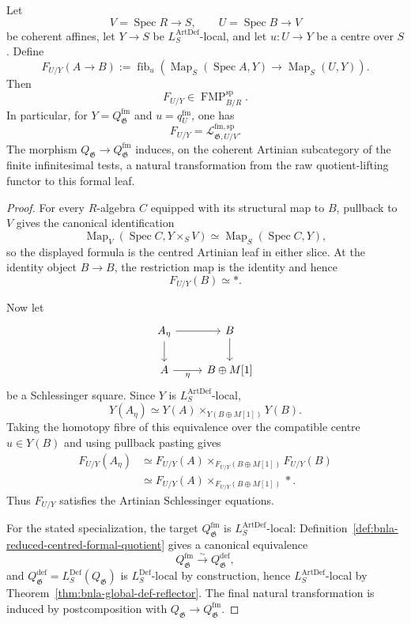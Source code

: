 \begin{proposition}
\label{prop:bnla-affine-leaf-is-fmp}
Let
\[
    V=\operatorname{Spec}R\longrightarrow S,
    \qquad
    U=\operatorname{Spec}B\longrightarrow V
\]
be coherent affines, let $Y\to S$ be $L^{\mathrm{ArtDef}}_S$-local, and let
$u:U\to Y$ be a centre over $S$.  Define
\[
\boxed{
    F_{U/Y}(A\to B)
    :=
    \operatorname{fib}_{u}
    \left(
        \operatorname{Map}_S(\operatorname{Spec}A,Y)
        \longrightarrow
        \operatorname{Map}_S(U,Y)
    \right).}
\]
Then
\[
\boxed{
    F_{U/Y}\in\operatorname{FMP}^{\mathrm{sp}}_{B/R}.}
\]
In particular, for
$Y=Q^{\mathrm{fm}}_{\mathfrak G}$ and $u=q^{\mathrm{fm}}_U$, one has
\[
    F_{U/Y}
    =
    \mathcal L^{\mathrm{fm,sp}}_{\mathfrak G,U/V}.
\]
The morphism
$Q_{\mathfrak G}\to Q^{\mathrm{fm}}_{\mathfrak G}$ induces, on the
coherent Artinian subcategory of the finite infinitesimal tests, a natural
transformation from the raw quotient-lifting functor to this formal leaf.
\end{proposition}

\begin{proof}
For every $R$-algebra $C$ equipped with its structural map to $B$, pullback to
$V$ gives the canonical identification
\[
    \operatorname{Map}_V
    \left(\operatorname{Spec}C,Y\times_SV\right)
    \simeq
    \operatorname{Map}_S(\operatorname{Spec}C,Y),
\]
so the displayed formula is the centred Artinian leaf in either slice.  At
the identity object $B\to B$, the restriction map is the identity and hence
\[
    F_{U/Y}(B)\simeq *.
\]

Now let
\[
\begin{tikzcd}
A_\eta \arrow[r] \arrow[d] & B \arrow[d]\\
A \arrow[r,"\eta"'] & B\oplus M[1]
\end{tikzcd}
\]
be a Schlessinger square.  Since $Y$ is $L^{\mathrm{ArtDef}}_S$-local,
\[
    Y(A_\eta)
    \simeq
    Y(A)\times_{Y(B\oplus M[1])}Y(B).
\]
Taking the homotopy fibre of this equivalence over the compatible centre
$u\in Y(B)$ and using pullback pasting gives
\[
\begin{aligned}
    F_{U/Y}(A_\eta)
    &\simeq
    F_{U/Y}(A)
    \times_{F_{U/Y}(B\oplus M[1])}
    F_{U/Y}(B)\\
    &\simeq
    F_{U/Y}(A)
    \times_{F_{U/Y}(B\oplus M[1])}*.
\end{aligned}
\]
Thus $F_{U/Y}$ satisfies the Artinian Schlessinger equations.

For the stated specialization, the target
$Q^{\mathrm{fm}}_{\mathfrak G}$ is $L^{\mathrm{ArtDef}}_S$-local:
Definition~\ref{def:bnla-reduced-centred-formal-quotient} gives a canonical
equivalence
\[
    Q^{\mathrm{fm}}_{\mathfrak G}
    \xrightarrow{\sim}
    Q^{\mathrm{def}}_{\mathfrak G},
\]
and $Q^{\mathrm{def}}_{\mathfrak G}=L^{\mathrm{Def}}_S(Q_{\mathfrak G})$
is $L^{\mathrm{Def}}_S$-local by construction, hence
$L^{\mathrm{ArtDef}}_S$-local by
Theorem~\ref{thm:bnla-global-def-reflector}.  The final natural transformation
is induced by postcomposition with
$Q_{\mathfrak G}\to Q^{\mathrm{fm}}_{\mathfrak G}$.
\end{proof}

